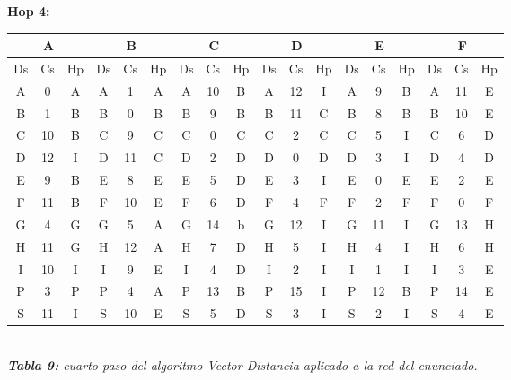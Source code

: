 \documentclass[letterpaper,10pt,onecolumn,titlepage]{article}
\begin{document}
 \textbf{Hop 4:}
 
 \begin{center}
   \begin{tabular}{|c|c|c|c|c|c|c|c|c|c|c|c|c|c|c|c|c|c|} \hline
     \multicolumn{3}{|c|}{A} & \multicolumn{3}{|c|}{B} & \multicolumn{3}{|c|}{C} & \multicolumn{3}{|c|}{D} & \multicolumn{3}{|c|}{E} & \multicolumn{3}{|c|}{F} \\ \hline
     Ds & Cs & Hp & Ds & Cs & Hp & Ds & Cs & Hp & Ds & Cs & Hp & Ds & Cs & Hp & Ds & Cs & Hp \\ \hline
     A  & 0  & A  & A  & 1  & A  & A  & 10  & B  & A  & 12  & I  & A  & 9  & B  & A  & 11  & E \\ \hline
     B  & 1  & B  & B  & 0  & B  & B  & 9  & B  & B  & 11  & C  & B  & 8  & B & B  & 10  & E \\ \hline
     C  & 10  & B  & C  & 9  & C  & C  & 0  & C  & C  & 2  & C  & C  & 5  & I  & C  & 6  & D \\ \hline
     D  & 12  & I  & D  & 11  & C & D  & 2  & D  & D  & 0  & D  & D  & 3  & I  & D  & 4  & D \\ \hline
     E  & 9  & B  & E  & 8  & E  & E  & 5  & D  & E  & 3  & I  & E  & 0  & E  & E  & 2  & E \\ \hline
     F  & 11  & B  & F  & 10  & E  & F  & 6  & D  & F  & 4  & F  & F  & 2  & F  & F  & 0  & F \\ \hline
     G  & 4  & G  & G  & 5  & A  & G  & 14  & b  & G  & 12  & I  & G  & 11  & I  & G  & 13  & H \\ \hline
     H  & 11  & G  & H  & 12  & A  & H  & 7  & D  & H  & 5  & I  & H  & 4  & I  & H  & 6  & H \\ \hline
     I  & 10  & I  & I  & 9  & E  & I  & 4  & D  & I  & 2  & I  & I  & 1  & I  & I  & 3  & E \\ \hline
     P  & 3  & P  & P  & 4  & A  & P  & 13  & B  & P  & 15  & I  & P  & 12  & B  & P  & \color{red}14  & \color{red}E \\ \hline
     S  & 11  & I  & S  & 10  & E  & S  & 5  & D  & S  & 3  & I  & S  & 2  & I  & S  & 4  & E \\ \hline
   \end{tabular}\\
   \textit{\textbf{Tabla 9:} cuarto paso del algoritmo Vector-Distancia aplicado a la red del enunciado.}
 \end{center}
 
\end{document}
